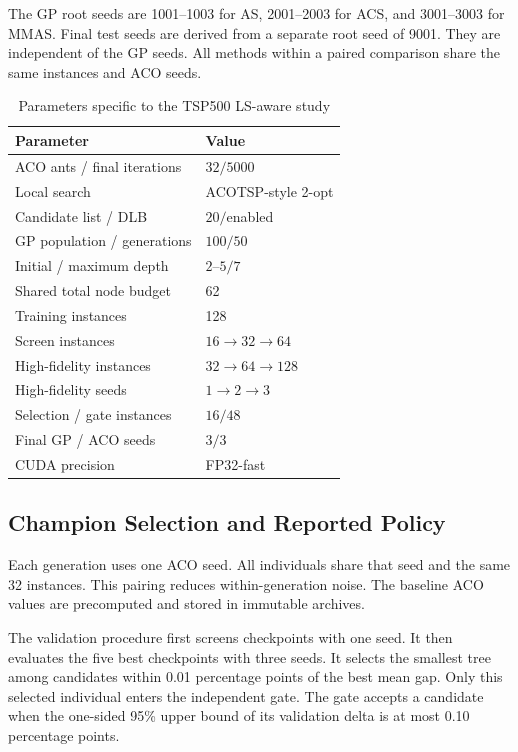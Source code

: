 \documentclass[letterpaper,journal]{IEEEtran}
\begin{document}
The GP root seeds are 1001--1003 for AS, 2001--2003 for ACS, and 3001--3003 for MMAS.
Final test seeds are derived from a separate root seed of 9001.
They are independent of the GP seeds.
All methods within a paired comparison share the same instances and ACO seeds.

\begin{table}[t]
\caption{Parameters specific to the TSP500 LS-aware study}
\label{tab:ls-parameters}
\centering
\footnotesize
\begin{tabular}{ll}
\toprule
Parameter & Value\\
\midrule
ACO ants / final iterations & \(32/5000\)\\
Local search & ACOTSP-style 2-opt\\
Candidate list / DLB & \(20/\)enabled\\
GP population / generations & \(100/50\)\\
Initial / maximum depth & \(2\)--\(5/7\)\\
Shared total node budget & 62\\
Training instances & 128\\
Screen instances & \(16\to32\to64\)\\
High-fidelity instances & \(32\to64\to128\)\\
High-fidelity seeds & \(1\to2\to3\)\\
Selection / gate instances & \(16/48\)\\
Final GP / ACO seeds & \(3/3\)\\
CUDA precision & FP32-fast\\
\bottomrule
\end{tabular}
\end{table}

\subsection{Champion Selection and Reported Policy}

Each generation uses one ACO seed.
All individuals share that seed and the same 32 instances.
This pairing reduces within-generation noise.
The baseline ACO values are precomputed and stored in immutable archives.

The validation procedure first screens checkpoints with one seed.
It then evaluates the five best checkpoints with three seeds.
It selects the smallest tree among candidates within 0.01 percentage points of the best mean gap.
Only this selected individual enters the independent gate.
The gate accepts a candidate when the one-sided 95\% upper bound of its validation delta is at most 0.10 percentage points.
\end{document}
